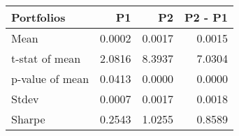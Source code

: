 \begin{tabular}{lrrr}
\toprule
Portfolios & P1 & P2 & P2 - P1 \\
\midrule
Mean & 0.0002 & 0.0017 & 0.0015 \\
t-stat of mean & 2.0816 & 8.3937 & 7.0304 \\
p-value of mean & 0.0413 & 0.0000 & 0.0000 \\
Stdev & 0.0007 & 0.0017 & 0.0018 \\
Sharpe & 0.2543 & 1.0255 & 0.8589 \\
\bottomrule
\end{tabular}
